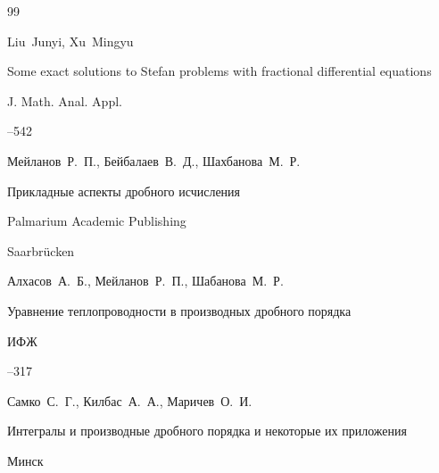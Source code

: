 




\RusRef



\begin{thebibliography}{99}




\by Liu~Junyi, Xu~Mingyu

\paper Some exact solutions to Stefan problems with fractional differential equations

\jour J. Math. Anal. Appl.




--542





\by Мейланов~Р.~П., Бейбалаев~В.~Д., Шахбанова~М.~Р.

\book Прикладные аспекты дробного исчисления

\publ Palmarium Academic Publishing

\publaddr  Saarbrücken






\by Алхасов~А.~Б., Мейланов~Р.~П., Шабанова~М.~Р.

\paper Уравнение теплопроводности в производных дробного порядка

\jour ИФЖ




--317


 


\by Самко~С.~Г., Килбас~А.~А., Маричев~О.~И.

\book Интегралы и производные дробного порядка и некоторые их приложения

\publaddr Минск


\end{thebibliography}
